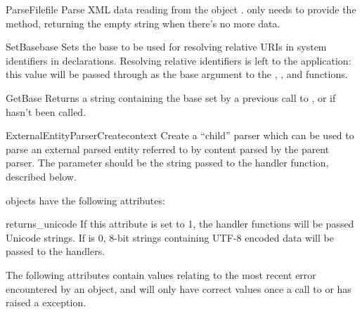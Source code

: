\begin{methoddesc}[xmlparser]{ParseFile}{file}
Parse XML data reading from the object .   only
needs to provide the  method, returning the
empty string when there's no more data.
\end{methoddesc}

\begin{methoddesc}[xmlparser]{SetBase}{base}
Sets the base to be used for resolving relative URIs in system identifiers in
declarations.  Resolving relative identifiers is left to the application:
this value will be passed through as the base argument to the
, ,
and  functions. 
\end{methoddesc}

\begin{methoddesc}[xmlparser]{GetBase}{}
Returns a string containing the base set by a previous call to
, or  if 
 hasn't been called.
\end{methoddesc}

\begin{methoddesc}[xmlparser]{ExternalEntityParserCreate}{context}
Create a ``child'' parser which can be used to parse an external
parsed entity referred to by content parsed by the parent parser.  The
 parameter should be the string passed to the
 handler function, described below.
\end{methoddesc}


 objects have the following attributes:

\begin{memberdesc}[xmlparser]{returns_unicode} 
If this attribute is set to 1, the handler functions will be passed
Unicode strings.  If  is 0, 8-bit strings
containing UTF-8 encoded data will be passed to the handlers.
\end{memberdesc}

The following attributes contain values relating to the most recent
error encountered by an  object, and will only have
correct values once a call to  or 
has raised a  exception.


